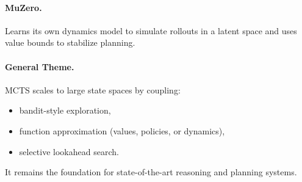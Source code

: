 \documentclass[12pt]{article}
\begin{document}
\paragraph{MuZero.}
Learns its own dynamics model to simulate rollouts in a latent space and uses value
bounds to stabilize planning.

\paragraph{General Theme.}
MCTS scales to large state spaces by coupling:
\begin{itemize}
		\item bandit-style exploration,
		\item function approximation (values, policies, or dynamics),
		\item selective lookahead search.
\end{itemize}
It remains the foundation for state-of-the-art reasoning and planning systems.
\end{document}
